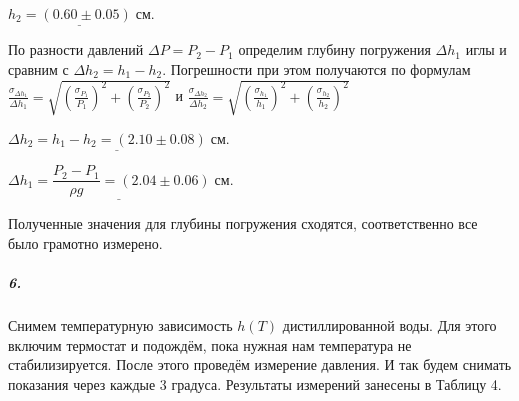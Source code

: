 \documentclass[a4paper, 12pt]{article}
\begin{document}
\begin{center}
$
\underline{h_2 = (0.60 \pm 0.05) \; \text{см}}.
$
\end{center}

По разности давлений $\Delta P= P_2 - P_1$ определим глубину погружения $\Delta h_1$ иглы и сравним с $\Delta h_2 =  h_1- h_2$. Погрешности при этом получаются по формулам $\frac{\sigma_{\Delta h_1} }{\Delta h_1}= \sqrt{\left(\frac{\sigma_{P_1}}{P_1}\right)^2 + \left(\frac{\sigma_{P_2}}{P_2}\right)^2}$ и $\frac{\sigma_{\Delta h_2} }{\Delta h_2}= \sqrt{\left(\frac{\sigma_{h_1}}{h_1}\right)^2 + \left(\frac{\sigma_{h_2}}{h_2}\right)^2}$

\begin{center}
    
$
\underline{\Delta h_2 = h_1 - h_2 = (2.10 \pm 0.08) \; \text{см}}.
$
    
\end{center}

\begin{center}
    
$
\underline{\Delta h_1 = \dfrac{P_2 - P_1}{\rho g} = (2.04 \pm 0.06) \; \text{см}}. 
$

\end{center}

Полученные значения для глубины погружения сходятся, соответственно все было грамотно измерено.

\subparagraph{6.} Снимем температурную зависимость $h (T)$ дистиллированной воды. Для этого включим термостат и подождём, пока нужная нам температура не стабилизируется. После этого проведём измерение давления. И так будем снимать показания через каждые 3 градуса. Результаты измерений занесены в Таблицу 4. 
\end{document}
